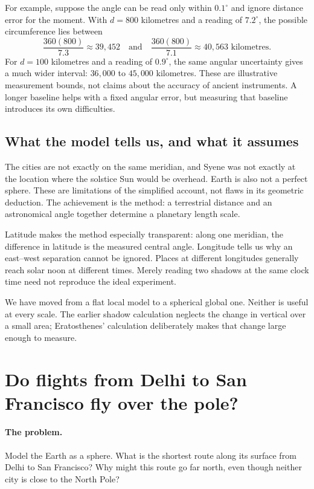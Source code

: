 For example, suppose the angle can be read only within $0.1^\circ$ and
ignore distance error for the moment. With $d=800$ kilometres and a reading
of $7.2^\circ$, the possible circumference lies between
\[
\frac{360(800)}{7.3}\approx39{,}452
\quad\text{and}\quad
\frac{360(800)}{7.1}\approx40{,}563\text{ kilometres}.
\]
For $d=100$ kilometres and a reading of $0.9^\circ$, the same angular
uncertainty gives a much wider interval: $36{,}000$ to $45{,}000$ kilometres.
These are illustrative measurement bounds, not claims about the accuracy
of ancient instruments. A longer baseline helps with a fixed angular
error, but measuring that baseline introduces its own difficulties.

\subsection{What the model tells us, and what it assumes}
The cities are not exactly on the same meridian, and Syene was not exactly
at the location where the solstice Sun would be overhead. Earth is also
not a perfect sphere. These are limitations of the simplified account,
not flaws in its geometric deduction. The achievement is the method:
a terrestrial distance and an astronomical angle together determine a
planetary length scale.

Latitude makes the method especially transparent: along one meridian,
the difference in latitude is the measured central angle. Longitude tells
us why an east--west separation cannot be ignored. Places at different
longitudes generally reach solar noon at different times. Merely reading
two shadows at the same clock time need not reproduce the ideal experiment.

We have moved from a flat local model to a spherical global one. Neither
is useful at every scale. The earlier shadow calculation neglects the
change in vertical over a small area; Eratosthenes' calculation deliberately
makes that change large enough to measure.

\section{Do flights from Delhi to San Francisco fly over the pole?}
\label{sec:geo-geodesics}

\paragraph{The problem.}
Model the Earth as a sphere. What is the shortest route along its surface
from Delhi to San Francisco? Why might this route go far north, even though
neither city is close to the North Pole?

